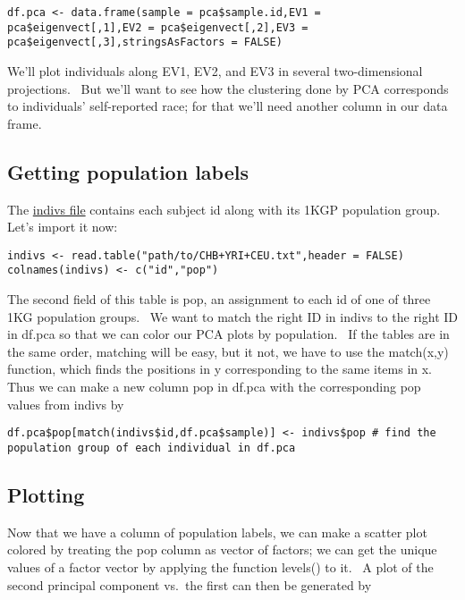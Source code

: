 \documentclass[
]{book}
\begin{document}
\begin{verbatim}
df.pca <- data.frame(sample = pca$sample.id,EV1 = pca$eigenvect[,1],EV2 = pca$eigenvect[,2],EV3 = pca$eigenvect[,3],stringsAsFactors = FALSE)
\end{verbatim}

We'll plot individuals along EV1, EV2, and EV3 in several two-dimensional projections.~ But we'll want to see how the clustering done by PCA corresponds to individuals' self-reported race; for that we'll need another column in our data frame.

\hypertarget{getting-population-labels}{%
\subsection{Getting population labels}\label{getting-population-labels}}

The \href{https://raw.githubusercontent.com/wletsou/BIOL-350/master/docs/CHB\%2BYRI\%2BCEU.txt}{indivs file} contains each subject id along with its 1KGP population group.~ Let's import it now:

\begin{verbatim}
indivs <- read.table("path/to/CHB+YRI+CEU.txt",header = FALSE)
colnames(indivs) <- c("id","pop")
\end{verbatim}

The second field of this table is pop, an assignment to each id of one of three 1KG population groups.~ We want to match the right ID in indivs to the right ID in df.pca so that we can color our PCA plots by population.~ If the tables are in the same order, matching will be easy, but it not, we have to use the match(x,y) function, which finds the positions in y corresponding to the same items in x.~ Thus we can make a new column pop in df.pca with the corresponding pop values from indivs by

\begin{verbatim}
df.pca$pop[match(indivs$id,df.pca$sample)] <- indivs$pop # find the population group of each individual in df.pca
\end{verbatim}

\hypertarget{plotting}{%
\subsection{Plotting}\label{plotting}}

Now that we have a column of population labels, we can make a scatter plot colored by treating the pop column as vector of factors; we can get the unique values of a factor vector by applying the function levels() to it.~ A plot of the second principal component vs.~the first can then be generated by
\end{document}
